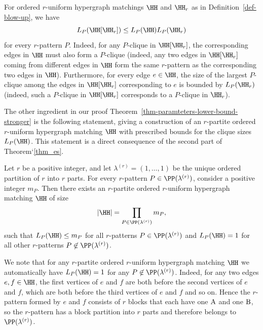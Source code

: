 For ordered $r$-uniform hypergraph matchings $\HH$ and $\HH_r$ as in Definition~\ref{def-blow-up}, we have
\begin{equation}\label{Lp}
L_P(\HH[\HH_r]) \le L_P(\HH) L_P(\HH_r)
\end{equation}
for every $r$-pattern $P$. Indeed, for any $P$-clique in $\HH[\HH_r]$, the corresponding edges in $\HH$ must also form a $P$-clique (indeed, any two edges in $\HH[\HH_r]$ coming from different edges in $\HH$ form the same $r$-pattern as the corresponding two edges in $\HH$). Furthermore, for every edge $e\in \HH$, the size of the largest $P$-clique among the edges in $\HH[\HH_r]$ corresponding to $e$ is bounded by $L_P(\HH_r)$ (indeed, such a $P$-clique in $\HH[\HH_r]$ corresponds to a $P$-clique in $\HH_r$).

The other ingredient in our proof Theorem~\ref{thm-paramteters-lower-bound-stronger} is the following statement, giving a construction of an $r$-partite ordered $r$-uniform hypergraph matching $\HH$ with prescribed bounds for the clique sizes $L_P(\HH)$. This statement is a direct consequence of the second part of Theorem`\ref{thm_es}.

\begin{lemma}\label{obs-construction-partite}
    Let $r$ be a positive integer, and let $\lambda^{(r)}=(1,\dots,1)$ be the unique ordered partition of $r$ into $r$ parts. For every $r$-pattern $P\in \PP(\lambda^{(r)})$, consider a positive integer $m_P$. Then there exists an $r$-partite ordered $r$-uniform hypergraph matching $\HH$ of size
\[|\HH|=\prod_{P\in \PP(\lambda^{(r)})} m_{P},\]
such that $L_P(\HH)\le m_P$ for all $r$-patterns $P\in \PP(\lambda^{(r)})$ and $L_P(\HH)=1$ for all other $r$-patterns $P\not\in \PP(\lambda^{(r)})$.
\end{lemma}

We note that for any $r$-partite ordered $r$-uniform hypergraph matching $\HH$ we automatically have $L_{P}(\HH)=1$ for any $P\not\in \PP(\lambda^{(r)})$. Indeed, for any two edges $e,f\in \HH$, the first vertices of $e$ and $f$ are both before the second vertices of $e$ and $f$, which are both before the third vertices of $e$ and $f$ and so on. Hence the $r$-pattern formed by $e$ and $f$ consists of $r$ blocks that each have one $\rm A$ and one $\rm B$, so the $r$-pattern has a block partition into $r$ parts and therefore belongs to $\PP(\lambda^{(r)})$.

